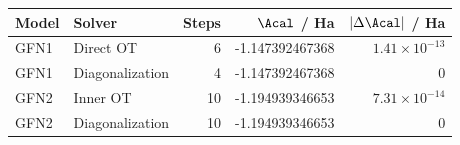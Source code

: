\begin{tabular}{llrrr}\toprule
Model & Solver & Steps & $\Acal$ / Ha & $|\Delta\Acal|$ / Ha\\\midrule
GFN1 & Direct OT & 6 & -1.147392467368 & $1.41\times10^{-13}$\\
GFN1 & Diagonalization & 4 & -1.147392467368 & $0$\\
GFN2 & Inner OT & 10 & -1.194939346653 & $7.31\times10^{-14}$\\
GFN2 & Diagonalization & 10 & -1.194939346653 & $0$\\
\bottomrule\end{tabular}
